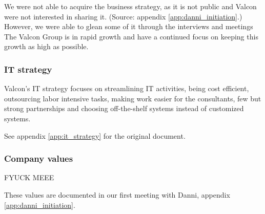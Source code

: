 We were not able to acquire the business strategy, as it is not public and Valcon were not interested in sharing it. (Source: appendix \ref{app:danni_initiation}.)
However, we were able to glean some of it through the interviews and meetings
The Valcon Group is in rapid growth and have a continued focus on keeping this growth as high as possible.

\subsubsection{IT strategy}
Valcon's IT strategy focuses on streamlining IT activities, being cost efficient, outsourcing labor intensive tasks, making work easier for the consultants, few but strong partnerships and choosing off-the-shelf systems instead of customized systems.

See appendix \ref{app:it_strategy} for the original document.

\subsubsection{Company values}
FYUCK MEEE 

These values are documented in our first meeting with Danni, appendix \ref{app:danni_initiation}.